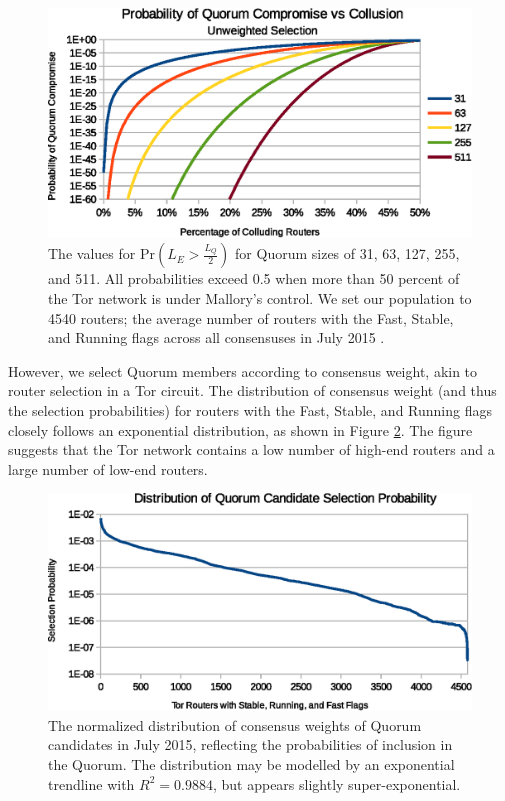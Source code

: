 \documentclass[USenglish,oneside,twocolumn]{article}
\begin{document}
\begin{figure}[h]
	\centering
	\includegraphics[width=\linewidth]{../assets/analysis/QuorumSelectionUnweighted.eps}
	\caption{The values for $ \mathrm{Pr}(L_{E} > \frac{L_{Q}}{2}) $ for Quorum sizes of 31, 63, 127, 255, and 511. All probabilities exceed 0.5 when more than 50 percent of the Tor network is under Mallory's control. We set our population to 4540 routers; the average number of routers with the Fast, Stable, and Running flags across all consensuses in July 2015 \cite{TorMetrics}.}
	\label{fig:quorumUnweightedMajority}
\end{figure}

However, we select Quorum members according to consensus weight, akin to router selection in a Tor circuit. The distribution of consensus weight (and thus the selection probabilities) for routers with the Fast, Stable, and Running flags closely follows an exponential distribution, as shown in Figure \ref{fig:weightDist}. The figure suggests that the Tor network contains a low number of high-end routers and a large number of low-end routers.

\begin{figure}[h]
	\centering
	\includegraphics[width=\linewidth]{../assets/analysis/QuorumCandidateWeights.eps}
	\caption{The normalized distribution of consensus weights of Quorum candidates in July 2015, reflecting the probabilities of inclusion in the Quorum. The distribution may be modelled by an exponential trendline with $ R^{2} = 0.9884 $, but appears slightly super-exponential.}
	\label{fig:weightDist}
\end{figure}
\end{document}

